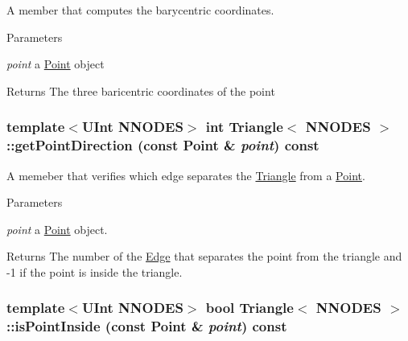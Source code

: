 A member that computes the barycentric coordinates. 
\begin{DoxyParams}{Parameters}
\item[{\em point}]a \hyperlink{classPoint}{Point} object \end{DoxyParams}
\begin{DoxyReturn}{Returns}
The three baricentric coordinates of the point 
\end{DoxyReturn}
\hypertarget{classTriangle_ad9d72fba98eaa955fca0ebc08584ee27}{
\subsubsection[{getPointDirection}]{\setlength{\rightskip}{0pt plus 5cm}template$<$UInt NNODES$>$ int {\bf Triangle}$<$ NNODES $>$::getPointDirection (const {\bf Point} \& {\em point}) const}}
\label{classTriangle_ad9d72fba98eaa955fca0ebc08584ee27}


A memeber that verifies which edge separates the \hyperlink{classTriangle}{Triangle} from a \hyperlink{classPoint}{Point}. 
\begin{DoxyParams}{Parameters}
\item[{\em point}]a \hyperlink{classPoint}{Point} object. \end{DoxyParams}
\begin{DoxyReturn}{Returns}
The number of the \hyperlink{classEdge}{Edge} that separates the point from the triangle and -\/1 if the point is inside the triangle. 
\end{DoxyReturn}
\hypertarget{classTriangle_a76c1691d2b89f8aef8913b0315371429}{
\subsubsection[{isPointInside}]{\setlength{\rightskip}{0pt plus 5cm}template$<$UInt NNODES$>$ bool {\bf Triangle}$<$ NNODES $>$::isPointInside (const {\bf Point} \& {\em point}) const}}
\label{classTriangle_a76c1691d2b89f8aef8913b0315371429}


